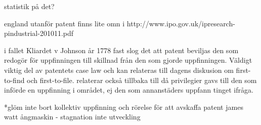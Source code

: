 statistik på det? 

england utanför patent finns lite omn i http://www.ipo.gov.uk/ipresearch-pindustrial-201011.pdf

i fallet Kliardet v Johnson år 1778 fast slog det att patent beviljas den som redogör för uppfinningen till skillnad från den som gjorde uppfinningen. Väldigt viktig del av patentets case law och kan relateras till dagens diskusion om first-to-find och first-to-file. relaterar också tillbaka till då privilegier gavs till den som införde en uppfinning i området, ej den som annanstäders uppfann tinget ifråga.

*glöm inte bort kollektiv uppfinning och rörelse för att avskaffa patent
james watt ångmaskin - stagnation inte utveckling

